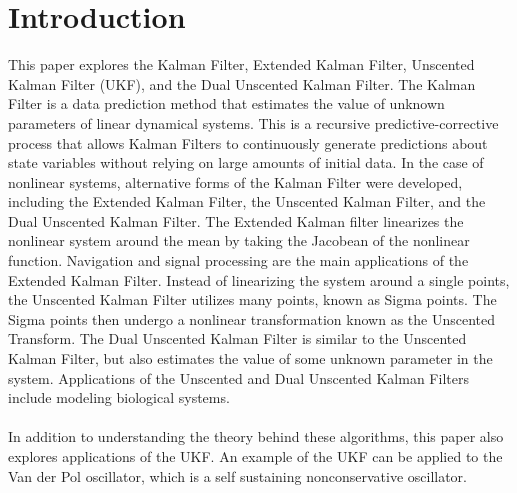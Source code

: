 \chapter{Introduction}
\label{Introduction}

This paper explores the Kalman Filter, Extended Kalman Filter, Unscented Kalman Filter (UKF), and the Dual Unscented Kalman Filter. The Kalman Filter is a data prediction method that estimates the value of unknown parameters of linear dynamical systems. This is a recursive predictive-corrective process that allows Kalman Filters to continuously generate predictions about state variables without relying on large amounts of initial data.  In the case of nonlinear systems, alternative forms of the Kalman Filter were developed, including the Extended Kalman Filter, the Unscented Kalman Filter, and the Dual Unscented Kalman Filter. The Extended Kalman filter linearizes the nonlinear system around the mean by taking the Jacobean of the nonlinear function. Navigation and signal processing are the main applications of the Extended Kalman Filter. Instead of linearizing the system around a single points, the Unscented Kalman Filter utilizes many points, known as Sigma points. The Sigma points then undergo a nonlinear transformation known as the Unscented Transform. The Dual Unscented Kalman Filter is similar to the Unscented Kalman Filter, but also estimates the value of some unknown parameter in the system. Applications of the Unscented and Dual Unscented Kalman Filters include modeling biological systems.  \\ \\
In addition to understanding the theory behind these algorithms, this paper also explores applications of the UKF. An example of the UKF can be applied to the Van der Pol oscillator, which is a self sustaining nonconservative oscillator.





